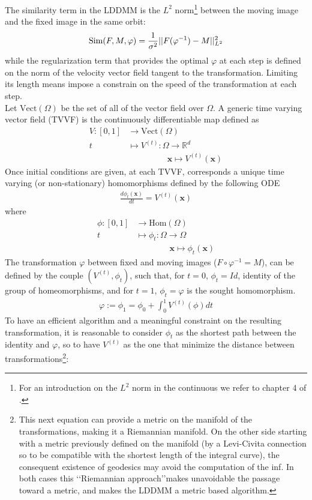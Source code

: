 The similarity term in the LDDMM is the $L^{2}$ norm\footnote{For an introduction on the $L^2$ norm in the continuous we refer to chapter 4 of \cite{stein2009real}.} between the moving image and the fixed image in the same orbit:
\begin{align*}
\text{Sim}(F,M,\varphi) = \frac{1}{\sigma^2}\vert\lvert F(\varphi^{-1})  - M   \rvert\vert_{L^{2}}^{2}
\end{align*}
while the regularization term that provides the optimal $\varphi$ at each step is defined on the norm of the velocity vector field tangent to the transformation. Limiting its length means impose a constrain on the speed of the transformation at each step. \\
Let $\text{Vect}(\Omega)$ be the set of all of the vector field over $\Omega$. A generic time varying vector field (TVVF) is the continuously differentiable map defined as
\begin{align*}
V:[0,1] & \longrightarrow  \text{Vect}(\Omega)\\
t  &\longmapsto  V^{(t)}  : \Omega \longrightarrow   \mathbb{R}^{d} \\
& \qquad \quad \quad ~~~\mathbf{x} \longmapsto V^{(t)}(\mathbf{x} )
\end{align*}
 Once initial conditions are given, at each TVVF, corresponds a unique time varying (or non-stationary) homomorphisms defined  by the following ODE 
\begin{align}\label{eq:ode_phi_v}
\frac{d\phi_{t} (\mathbf{x})}{dt} = V^{(t)}(\mathbf{x} )
\end{align}
where 
\begin{align*}
\phi : [0,1] & \longrightarrow  \text{Hom}(\Omega)\\
t  &\longmapsto \phi_{t}  : \Omega \longrightarrow    \Omega \\
& \qquad \quad \quad  \mathbf{x} \longmapsto \phi_{t}  (\mathbf{x} )
\end{align*}
The transformation $\varphi$ between fixed and moving images ($ F\circ \varphi^{-1} = M $), can be defined by the couple $(V^{(t)},\phi_{t})$, such that, for $t = 0$, $\phi_{t} = Id$, identity of the group of homeomorphisms, and for $t = 1$, $\phi_{t} = \varphi$ is the sought homomorphism.
\begin{align*}
\varphi := \phi_{1} = \phi_{0} + \int_0^1 V^{(t)} (\phi) dt
\end{align*}
To have an efficient algorithm and a meaningful constraint on the resulting transformation, it is reasonable to consider $\phi_{t}$ as the shortest path between the identity and $\varphi$, so to have $V^{(t)} $ as the one that minimize the distance between transformations\footnote{This next equation can provide a metric on the manifold of the transformations, making it a Riemannian manifold. On the other side starting with a metric previously defined on the manifold (by a Levi-Civita connection so to be compatible with the shortest length of the integral curve), the consequent existence of geodesics may avoid the computation of the inf. In both cases this \lq\lq Riemannian approach\rq\rq  makes unavoidable the passage toward a metric, and makes the LDDMM a metric based algorithm.}:

